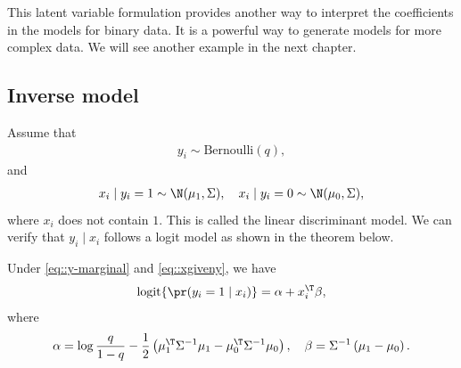 This latent variable formulation provides another way to interpret the coefficients in the models for binary data. It is a powerful way to generate models for more complex data. We will see another example in the next chapter. 




\subsection{Inverse model}\label{subsec:Inverse-model-gaussian-mixture}

Assume that 
\begin{eqnarray}
y_{i}\sim\text{Bernoulli}(q),
\label{eq::y-marginal}
\end{eqnarray}
and
\begin{eqnarray}
x_{i}\mid y_{i}=1\sim\N(\mu_{1},\Sigma),\quad x_{i}\mid y_{i}=0\sim\N(\mu_{0},\Sigma),
\label{eq::xgiveny}
\end{eqnarray} 
where $x_i$ does not contain $1$.
This is called the linear discriminant model. 
We can verify that $y_{i}\mid x_{i}$ follows a logit model as shown in the theorem below.  


\begin{theorem}
\label{thm::inverse-logit}
Under \eqref{eq::y-marginal} and \eqref{eq::xgiveny}, we have
$$
\textup{logit}\{  \pr(y_i =1\mid x_i) \} = \alpha + x_i^{\T} \beta, 
$$
where
\begin{eqnarray}
\label{eq::alpha-beta-lda}
\alpha = \log\frac{q}{1-q}-\frac{1}{2}\left(\mu_{1}^{\T}\Sigma^{-1}\mu_{1}-\mu_{0}^{\T}\Sigma^{-1}\mu_{0}\right)  ,\quad
\beta = \Sigma^{-1}\left(\mu_{1}-\mu_{0}\right) . 
\end{eqnarray}
\end{theorem}

